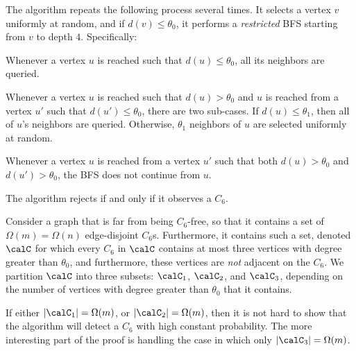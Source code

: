 The algorithm repeats the following process several times. It selects a vertex $v$ uniformly at random, and if $d(v) \leq \theta_0$, it performs a \emph{restricted} BFS starting from $v$ to depth $4$. Specifically:
\begin{packed_enum}
           \item Whenever a vertex $u$ is reached such that $d(u) \leq \theta_0$, all its neighbors are queried.
           \item Whenever a vertex $u$ is reached such that $d(u) > \theta_0$ and $u$ is reached from a vertex $u'$ such that $d(u') \leq \theta_0$, there are two sub-cases. If $d(u) \leq \theta_1$, then  all of $u$'s neighbors are queried. Otherwise,  $\theta_1$ neighbors of $u$ are selected uniformly at random. \label{step:C6_rand_nbr}
           \item Whenever a vertex $u$ is reached from a vertex $u'$ such that both $d(u)>\theta_0$ and $d(u') > \theta_0$, the BFS does not continue from $u$.
\end{packed_enum}
         
The algorithm rejects if and only if it observes a $C_6$.

Consider a graph that is far from being $C_6$-free, so that it contains a set  of $\Omega(m)=\Omega(n)$ edge-disjoint $C_6$s. Furthermore, it contains such a set, denoted $\calC$ for which every $C_6$ in $\calC$ contains at most three vertices with degree greater than $\theta_0$, and furthermore, these vertices are  \emph{not} adjacent on the $C_6$. We partition $\calC$ into three subsets: $\calC_1$, $\calC_2$, and $\calC_3$, depending on the number of vertices with degree greater than $\theta_0$ that it contains.

If either $|\calC_1| = \Omega(m)$, or $|\calC_2| = \Omega(m)$, then it is not hard to show that the algorithm will detect a $C_6$ with high constant probability. The more interesting part of the proof is handling the case in which only $|\calC_3| = \Omega(m)$.

